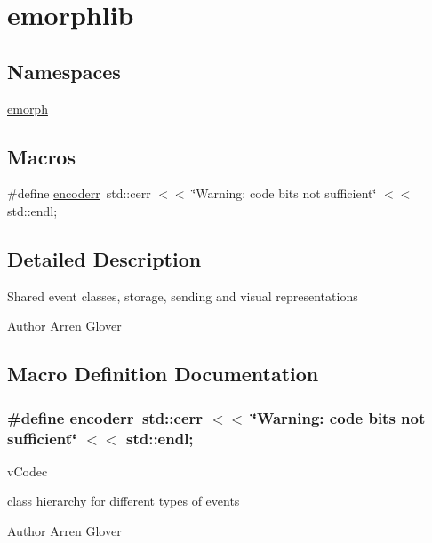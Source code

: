 \hypertarget{group__emorphlib}{\section{emorphlib}
\label{group__emorphlib}
}
\subsection*{Namespaces}
\begin{DoxyCompactItemize}
\item 
\hyperlink{namespaceemorph}{emorph}
\end{DoxyCompactItemize}
\subsection*{Macros}
\begin{DoxyCompactItemize}
\item 
\#define \hyperlink{group__emorphlib_gaf226c636945aba97a1ad8f2f78666547}{encoderr}~std\-::cerr $<$$<$ \char`\"{}Warning\-: code bits not sufficient\char`\"{} $<$$<$ std\-::endl;
\end{DoxyCompactItemize}


\subsection{Detailed Description}
Shared event classes, storage, sending and visual representations

\begin{DoxyAuthor}{Author}
Arren Glover 
\end{DoxyAuthor}


\subsection{Macro Definition Documentation}
\hypertarget{group__emorphlib_gaf226c636945aba97a1ad8f2f78666547}{
\subsubsection[{encoderr}]{\setlength{\rightskip}{0pt plus 5cm}\#define encoderr~std\-::cerr $<$$<$ \char`\"{}Warning\-: code bits not sufficient\char`\"{} $<$$<$ std\-::endl;}}\label{group__emorphlib_gaf226c636945aba97a1ad8f2f78666547}
v\-Codec

class hierarchy for different types of events

\begin{DoxyAuthor}{Author}
Arren Glover 
\end{DoxyAuthor}
